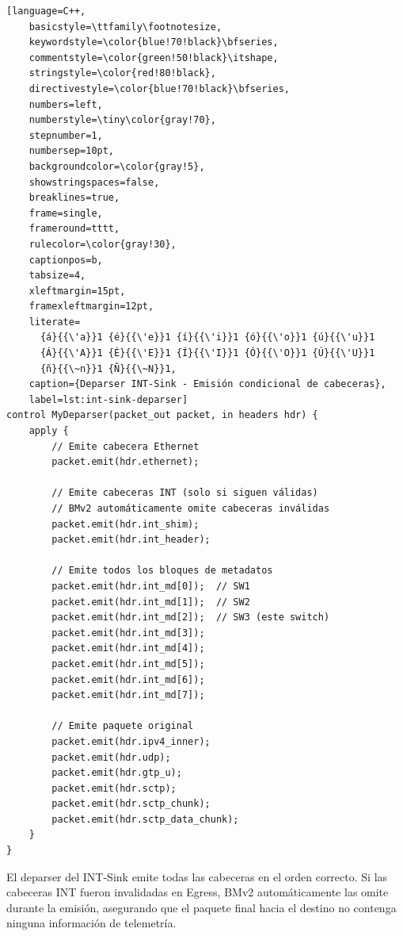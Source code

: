 \begin{lstlisting}[language=C++,
    basicstyle=\ttfamily\footnotesize,
    keywordstyle=\color{blue!70!black}\bfseries,
    commentstyle=\color{green!50!black}\itshape,
    stringstyle=\color{red!80!black},
    directivestyle=\color{blue!70!black}\bfseries,
    numbers=left,
    numberstyle=\tiny\color{gray!70},
    stepnumber=1,
    numbersep=10pt,
    backgroundcolor=\color{gray!5},
    showstringspaces=false,
    breaklines=true,
    frame=single,
    frameround=tttt,
    rulecolor=\color{gray!30},
    captionpos=b,
    tabsize=4,
    xleftmargin=15pt,
    framexleftmargin=12pt,
    literate=
      {á}{{\'a}}1 {é}{{\'e}}1 {í}{{\'i}}1 {ó}{{\'o}}1 {ú}{{\'u}}1
      {Á}{{\'A}}1 {É}{{\'E}}1 {Í}{{\'I}}1 {Ó}{{\'O}}1 {Ú}{{\'U}}1
      {ñ}{{\~n}}1 {Ñ}{{\~N}}1,
    caption={Deparser INT-Sink - Emisión condicional de cabeceras}, 
    label=lst:int-sink-deparser]
control MyDeparser(packet_out packet, in headers hdr) {
    apply {
        // Emite cabecera Ethernet
        packet.emit(hdr.ethernet);

        // Emite cabeceras INT (solo si siguen válidas)
        // BMv2 automáticamente omite cabeceras inválidas
        packet.emit(hdr.int_shim);
        packet.emit(hdr.int_header);

        // Emite todos los bloques de metadatos
        packet.emit(hdr.int_md[0]);  // SW1
        packet.emit(hdr.int_md[1]);  // SW2
        packet.emit(hdr.int_md[2]);  // SW3 (este switch)
        packet.emit(hdr.int_md[3]);
        packet.emit(hdr.int_md[4]);
        packet.emit(hdr.int_md[5]);
        packet.emit(hdr.int_md[6]);
        packet.emit(hdr.int_md[7]);

        // Emite paquete original
        packet.emit(hdr.ipv4_inner);
        packet.emit(hdr.udp);
        packet.emit(hdr.gtp_u);
        packet.emit(hdr.sctp);
        packet.emit(hdr.sctp_chunk);
        packet.emit(hdr.sctp_data_chunk);
    }
}
\end{lstlisting}
El deparser del INT-Sink emite todas las cabeceras en el orden correcto. Si las cabeceras INT fueron invalidadas en Egress, BMv2 automáticamente las omite durante la emisión, asegurando que el paquete final hacia el destino no contenga ninguna información de telemetría.

